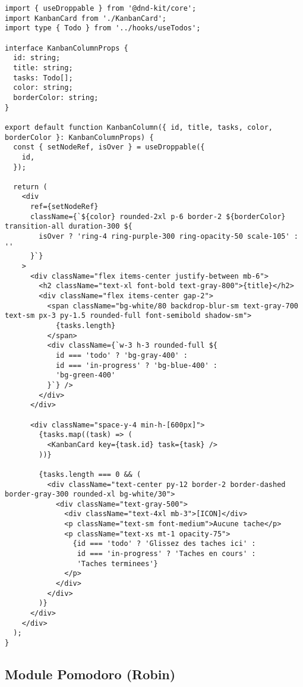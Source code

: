 \documentclass[12pt,a4paper]{article}
\begin{document}
\begin{lstlisting}[caption=KanbanColumn.tsx - Colonne du tableau Kanban (Tomas)]
import { useDroppable } from '@dnd-kit/core';
import KanbanCard from './KanbanCard';
import type { Todo } from '../hooks/useTodos';

interface KanbanColumnProps {
  id: string;
  title: string;
  tasks: Todo[];
  color: string;
  borderColor: string;
}

export default function KanbanColumn({ id, title, tasks, color, borderColor }: KanbanColumnProps) {
  const { setNodeRef, isOver } = useDroppable({
    id,
  });

  return (
    <div
      ref={setNodeRef}
      className={`${color} rounded-2xl p-6 border-2 ${borderColor} transition-all duration-300 ${
        isOver ? 'ring-4 ring-purple-300 ring-opacity-50 scale-105' : ''
      }`}
    >
      <div className="flex items-center justify-between mb-6">
        <h2 className="text-xl font-bold text-gray-800">{title}</h2>
        <div className="flex items-center gap-2">
          <span className="bg-white/80 backdrop-blur-sm text-gray-700 text-sm px-3 py-1.5 rounded-full font-semibold shadow-sm">
            {tasks.length}
          </span>
          <div className={`w-3 h-3 rounded-full ${
            id === 'todo' ? 'bg-gray-400' :
            id === 'in-progress' ? 'bg-blue-400' :
            'bg-green-400'
          }`} />
        </div>
      </div>
      
      <div className="space-y-4 min-h-[600px]">
        {tasks.map((task) => (
          <KanbanCard key={task.id} task={task} />
        ))}
        
        {tasks.length === 0 && (
          <div className="text-center py-12 border-2 border-dashed border-gray-300 rounded-xl bg-white/30">
            <div className="text-gray-500">
              <div className="text-4xl mb-3">[ICON]</div>
              <p className="text-sm font-medium">Aucune tache</p>
              <p className="text-xs mt-1 opacity-75">
                {id === 'todo' ? 'Glissez des taches ici' :
                 id === 'in-progress' ? 'Taches en cours' :
                 'Taches terminees'}
              </p>
            </div>
          </div>
        )}
      </div>
    </div>
  );
}
\end{lstlisting}

\subsection{Module Pomodoro (Robin)}
\end{document}
